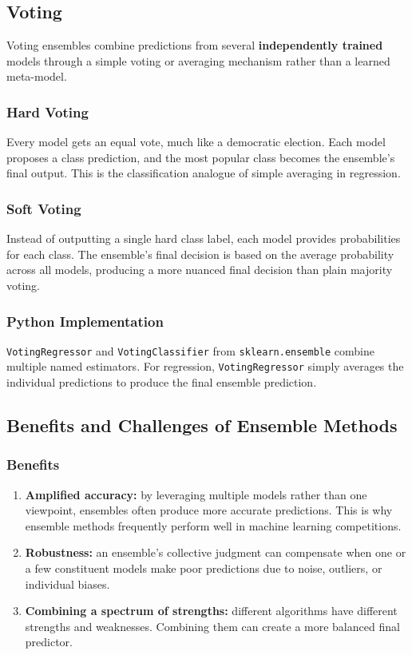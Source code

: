 \documentclass[12pt,openany]{book}
\begin{document}
\subsection{Voting}

Voting ensembles combine predictions from several \textbf{independently trained} models through a simple voting or averaging mechanism rather than a learned meta-model.

\subsubsection{Hard Voting}

Every model gets an equal vote, much like a democratic election. Each model proposes a class prediction, and the most popular class becomes the ensemble's final output. This is the classification analogue of simple averaging in regression.

\subsubsection{Soft Voting}

Instead of outputting a single hard class label, each model provides probabilities for each class. The ensemble's final decision is based on the average probability across all models, producing a more nuanced final decision than plain majority voting.

\subsubsection{Python Implementation}

\texttt{VotingRegressor} and \texttt{VotingClassifier} from \texttt{sklearn.ensemble} combine multiple named estimators. For regression, \texttt{VotingRegressor} simply averages the individual predictions to produce the final ensemble prediction.

\subsection{Benefits and Challenges of Ensemble Methods}

\subsubsection{Benefits}

\begin{enumerate}[leftmargin=*]
    \item \textbf{Amplified accuracy:} by leveraging multiple models rather than one viewpoint, ensembles often produce more accurate predictions. This is why ensemble methods frequently perform well in machine learning competitions.
    \item \textbf{Robustness:} an ensemble's collective judgment can compensate when one or a few constituent models make poor predictions due to noise, outliers, or individual biases.
    \item \textbf{Combining a spectrum of strengths:} different algorithms have different strengths and weaknesses. Combining them can create a more balanced final predictor.
\end{enumerate}
\end{document}
